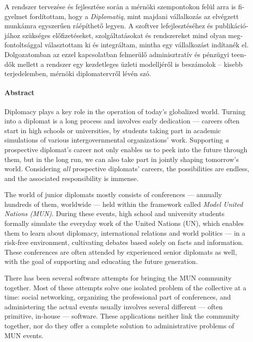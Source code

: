 \begin{otherlanguage}{magyar}
A rendszer tervezése és fejlesztése során a mérnöki szempontokon felül arra is figyelmet fordítottam, hogy a \emph{Diplomatiq}, mint majdani vállalkozás az elvégzett munkámra egyszerűen ráépíthető legyen. A szoftver lefejlesztéséhez és publikációjához szükséges előfizetéseket, szolgáltatásokat és rendszereket mind olyan megfontoltsággal választottam ki és integráltam, mintha egy vállalkozást indítanék el. Dolgozatomban az ezzel kapcsolatban felmerülő adminisztratív és pénzügyi teendők mellett a rendszer egy kezdetleges üzleti modelljéről is beszámolok – kisebb terjedelemben, mérnöki diplomatervről lévén szó.

\end{otherlanguage}

\clearpage

\paragraph*{Abstract}
{}
\thispagestyle{plain}

Diplomacy plays a key role in the operation of today's globalized world. Turning into a diplomat is a long process and involves early dedication — careers often start in high schools or universities, by students taking part in academic simulations of various intergovernmental organizations' work. Supporting \emph{a} prospective diplomat's career not only enables us to peek into the future through them, but in the long run, we can also take part in jointly shaping tomorrow's world. Considering \emph{all} prospective diplomats' careers, the possibilities are endless, and the associated responsibility is immense.

The world of junior diplomats mostly consists of conferences — annually hundreds of them, worldwide — held within the framework called \emph{Model United Nations (MUN)}. During these events, high school and university students formally simulate the everyday work of the United Nations (UN), which enables them to learn about diplomacy, international relations and world politics — in a risk-free environment, cultivating debates based solely on facts and information. These conferences are often attended by experienced senior diplomats as well, with the goal of supporting and educating the future generation.

There has been several software attempts for bringing the MUN community together. Most of these attempts solve one isolated problem of the collective at a time: social networking, organizing the professional part of conferences, and administering the actual events usually involves several different — often primitive, in-house — software. These applications neither link the community together, nor do they offer a complete solution to administrative problems of MUN events.

